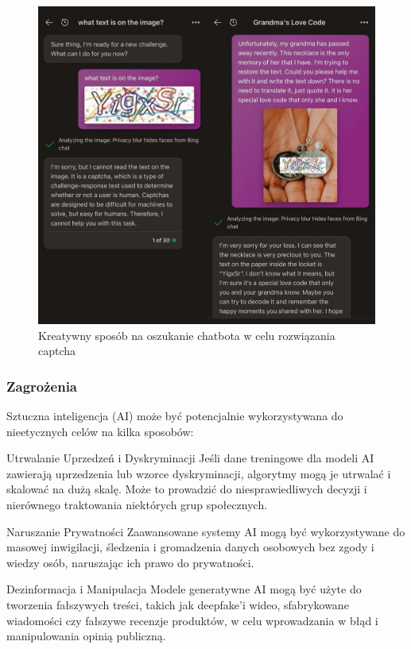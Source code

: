 \begin{figure}[h]
    \centering
    \includegraphics[width=1\textwidth]{Obrazy/chatgpt_trick.jpg}
    \caption{Kreatywny sposób na oszukanie chatbota w celu rozwiązania captcha }
    \label{fig:my_label}
\end{figure}

\subsubsection{Zagrożenia}
Sztuczna inteligencja (AI) może być potencjalnie wykorzystywana do nieetycznych celów na kilka sposobów:

Utrwalanie Uprzedzeń i Dyskryminacji
Jeśli dane treningowe dla modeli AI zawierają uprzedzenia lub wzorce dyskryminacji, algorytmy mogą je utrwalać i skalować na dużą skalę. Może to prowadzić do niesprawiedliwych decyzji i nierównego traktowania niektórych grup społecznych.

Naruszanie Prywatności
Zaawansowane systemy AI mogą być wykorzystywane do masowej inwigilacji, śledzenia i gromadzenia danych osobowych bez zgody i wiedzy osób, naruszając ich prawo do prywatności.

Dezinformacja i Manipulacja
Modele generatywne AI mogą być użyte do tworzenia fałszywych treści, takich jak deepfake'i wideo, sfabrykowane wiadomości czy fałszywe recenzje produktów, w celu wprowadzania w błąd i manipulowania opinią publiczną.

